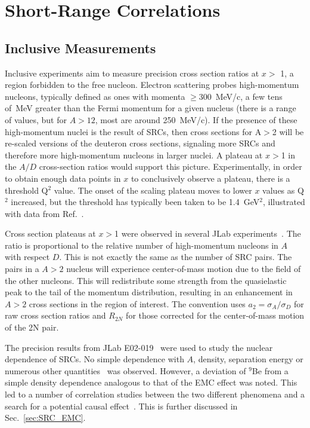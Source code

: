 \section{Short-Range Correlations}

\subsection{Inclusive Measurements}
Inclusive experiments aim to measure precision cross section ratios at $x >$ 1, a region forbidden to the free nucleon.   Electron scattering probes high-momentum nucleons, typically defined as ones with momenta $\ge$300~MeV/c, a few tens of~MeV greater than the Fermi momentum for a given nucleus (there is a range of values, but for $A>12$, most are around 250~MeV/c). If the presence of these high-momentum nuclei is the result of SRCs, then cross sections for A$>$2 will be re-scaled versions of the deuteron cross sections, signaling more SRCs and therefore more high-momentum nucleons in larger nuclei.   A plateau at $x>$1 in the $A/D$ cross-section ratios would support this picture.    Experimentally, in order to obtain enough data points in $x$ to conclusively observe a plateau, there is a threshold Q$^2$ value.  The onset of the scaling plateau moves to lower $x$ values as Q$^2$ increased, but the threshold has typically been taken to be 1.4~GeV$^2$, illustrated with data from Ref.~\cite{Egiyan:2003vg}.

Cross section plateaus at $x>$1 were observed in several JLab experiments~\cite{Egiyan:2003vg, Fomin:2011ng}.  The ratio is proportional to the relative number of high-momentum nucleons in $A$ with respect $D$.  This is not exactly the same as the number of SRC pairs.   The pairs in a $A>2$ nucleus will experience center-of-mass motion due to the field of the other nucleons.  This will redistribute some strength from the quasielastic peak to the tail of the momentum distribution, resulting in an enhancement in $A>2$ cross sections in the region of interest.  The convention uses $a_2=\sigma_A/\sigma_D$ for raw cross section ratios and $R_{2N}$ for those corrected for the center-of-mass motion of the 2N pair. 


The precision results from JLab E02-019~\cite{Fomin:2011ng} were used to study the nuclear dependence of SRCs. No simple dependence with $A$, density, separation energy or numerous other quantities~\cite{PhysRevC.86.065204} was observed.  However, a deviation of $^9$Be from a simple density dependence analogous to that of the EMC effect was noted.  This led to a number of correlation studies between the two different phenomena and a search for a potential causal effect~\cite{PhysRevC.86.065204, Hen:2012fm, Weinstein:2010rt}.  This is further discussed in Sec.~\ref{sec:SRC_EMC}.

